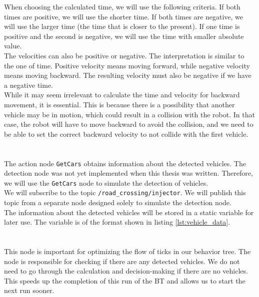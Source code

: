         When choosing the calculated time, we will use the following criteria. If both times are positive, we will use the shorter time. If both times are negative, we will use the larger time (the time that is closer to the present). If one time is positive and the second is negative, we will use the time with smaller absolute value.\\
        The velocities can also be positive or negative. The interpretation is similar to the one of time. Positive velocity means moving forward, while negative velocity means moving backward. The resulting velocity must also be negative if we have a negative time.\\
        While it may seem irrelevant to calculate the time and velocity for backward movement, it is essential. This is because there is a possibility that another vehicle may be in motion, which could result in a collision with the robot. In that case, the robot will have to move backward to avoid the collision, and we need to be able to set the correct backward velocity to not collide with the first vehicle.\\\\
    \\
        The action node \texttt{GetCars} obtains information about the detected vehicles. The detection node was not yet implemented when this thesis was written. Therefore, we will use the \texttt{GetCars} node to simulate the detection of vehicles.\\
        We will subscribe to the topic \texttt{/road\_crossing/injector}. We will publish this topic from a separate node designed solely to simulate the detection node.\\
        The information about the detected vehicles will be stored in a static variable for later use. The variable is of the format shown in listing \ref{lst:vehicle_data}.\\\\
    \\
        This node is important for optimizing the flow of ticks in our behavior tree. The node is responsible for checking if there are any detected vehicles. We do not need to go through the calculation and decision-making if there are no vehicles. This speeds up the completion of this run of the BT and allows us to start the next run sooner.\\\\
    \\
